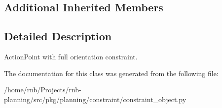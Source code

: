 \subsection*{Additional Inherited Members}


\subsection{Detailed Description}
Action\+Point with full orientation constraint. 

The documentation for this class was generated from the following file\+:\begin{DoxyCompactItemize}
\item 
/home/rnb/\+Projects/rnb-\/planning/src/pkg/planning/constraint/constraint\+\_\+object.\+py\end{DoxyCompactItemize}
